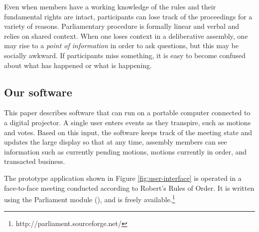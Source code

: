 \documentclass{book}
\begin{document}
Even when members have a working knowledge of the rules and their fundamental rights are intact, participants can lose track of the proceedings for a variety of reasons. Parliamentary procedure is formally linear and verbal and relies on shared context. 
When one loses context in a deliberative assembly, one may rise to a \emph{point of information} in order to ask questions, but this may be socially awkward. If participants miss something, it is easy to become confused about what has happened or what is happening.


\subsection{Our software}
\label{sec:support-technology}





This paper describes software that can run on a portable computer connected to a digital projector. A single user enters events as they transpire, such as motions and votes. Based on this input, the software keeps track of the meeting state and updates the large display so that at any time, assembly members can see information such as currently pending motions, motions currently in order, and transacted business.


The prototype application shown in Figure \ref{fig:user-interface} is operated in a face-to-face meeting conducted according to Robert's Rules of Order. It is written using the Parliament module (\citealt{shanks2006}), and is freely available.\footnote{http://parliament.sourceforge.net/} 

 


\end{document}
